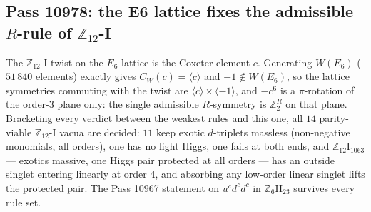 \subsection{Pass 10978: the E6 lattice fixes the admissible $R$-rule of $\mathbb{Z}_{12}$-I}

The $\mathbb{Z}_{12}$-I twist on the $E_6$ lattice is the Coxeter element $c$.  Generating $W(E_6)$ ($51\,840$ elements)
exactly gives $C_W(c)=\langle c\rangle$ and $-1\notin W(E_6)$, so the lattice symmetries commuting with the twist are
$\langle c\rangle\times\langle-1\rangle$, and $-c^6$ is a $\pi$-rotation of the order-$3$ plane only: the single admissible
$R$-symmetry is $\mathbb{Z}_2^R$ on that plane.  Bracketing every verdict between the weakest rules and this one,
all $14$ parity-viable $\mathbb{Z}_{12}$-I vacua are decided: $11$ keep exotic $d$-triplets massless (non-negative
monomials, all orders), one has no light Higgs, one fails at both ends, and $\mathbb{Z}_{12}$I$_{1063}$ --- exotics massive,
one Higgs pair protected at all orders --- has an outside singlet entering linearly at order $4$, and absorbing any
low-order linear singlet lifts the protected pair.  The Pass 10967 statement on $u^cd^cd^c$ in $\mathbb{Z}_6$II$_{23}$
survives every rule set.
